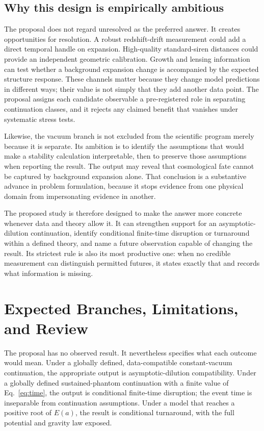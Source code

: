 \documentclass[conference]{IEEEtran}
\begin{document}
\subsection{Why this design is empirically ambitious}

The proposal does not regard unresolved as the preferred answer. It creates opportunities for resolution. A robust redshift-drift measurement could add a direct temporal handle on expansion. High-quality standard-siren distances could provide an independent geometric calibration. Growth and lensing information can test whether a background expansion change is accompanied by the expected structure response. These channels matter because they change model predictions in different ways; their value is not simply that they add another data point. The proposal assigns each candidate observable a pre-registered role in separating continuation classes, and it rejects any claimed benefit that vanishes under systematic stress tests.

Likewise, the vacuum branch is not excluded from the scientific program merely because it is separate. Its ambition is to identify the assumptions that would make a stability calculation interpretable, then to preserve those assumptions when reporting the result. The output may reveal that cosmological fate cannot be captured by background expansion alone. That conclusion is a substantive advance in problem formulation, because it stops evidence from one physical domain from impersonating evidence in another.

The proposed study is therefore designed to make the answer more concrete whenever data and theory allow it. It can strengthen support for an asymptotic-dilution continuation, identify conditional finite-time disruption or turnaround within a defined theory, and name a future observation capable of changing the result. Its strictest rule is also its most productive one: when no credible measurement can distinguish permitted futures, it states exactly that and records what information is missing.
\section{Expected Branches, Limitations, and Review}

The proposal has no observed result. It nevertheless specifies what each outcome would mean. Under a globally defined, data-compatible constant-vacuum continuation, the appropriate output is asymptotic-dilution compatibility. Under a globally defined sustained-phantom continuation with a finite value of Eq.~\eqref{eq:time}, the output is conditional finite-time disruption; the event time is inseparable from continuation assumptions. Under a model that reaches a positive root of \(E(a)\), the result is conditional turnaround, with the full potential and gravity law exposed.
\end{document}
